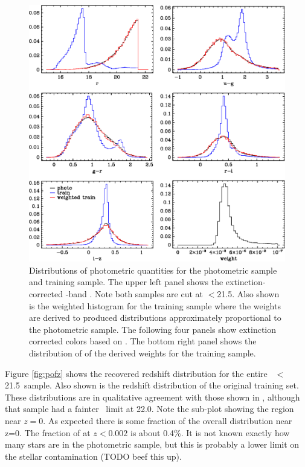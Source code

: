 \documentclass[preprint]{aastex}
\newcommand{\rmax}{21.5}
\begin{document}
\begin{figure}[t] \centering
    \includegraphics{figures/zweight-09-varhist.eps}

    \caption{Distributions of photometric quantities for the photometric sample
    and training sample.  The upper left panel shows the extinction-corrected
    \rmag-band \cmodelmag.  Note both samples are cut at \rmag$ < $\rmax.  
    Also shown is the weighted histogram for the training sample where
    the weights are derived to produced distributions approximately 
    proportional to the photometric sample.
    The following four panels show extinction corrected colors based on
    \modelmag.  The bottom right panel shows the distribution of of the
    derived weights for the training sample.}
    \label{fig:varhist}

    \vspace{2em}
\end{figure}

Figure \ref{fig:pofz} shows the recovered redshift distribution for the entire
\rmag\ $<$ \rmax\ sample.  Also shown is the redshift distribution of the
original training set.  These distributions are in qualitative agreement with
those shown in \citet{CunhaPhotoz09}, although that sample had a fainter \rmag\
limit at 22.0.  Note the sub-plot showing the region near $z=0$.  As expected
there is some fraction of the overall distribution near z=0.  The fraction of
at $z < 0.002$ is about 0.4\%.  It is not known exactly how many stars are in
the photometric sample, but this is probably a lower limit on the stellar
contamination (TODO beef this up).
\end{document}
